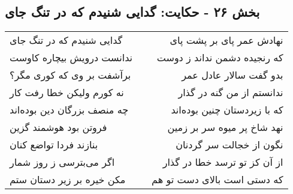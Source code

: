 \begin{center}
\section*{بخش ۲۶ - حکایت: گدایی شنیدم که در تنگ جای}
\label{sec:026}
\begin{longtable}{l p{0.5cm} r}
گدایی شنیدم که در تنگ جای
&&
نهادش عمر پای بر پشت پای
\\
ندانست درویش بیچاره کاوست
&&
که رنجیده دشمن نداند ز دوست
\\
برآشفت بر وی که کوری مگر؟
&&
بدو گفت سالار عادل عمر
\\
نه کورم ولیکن خطا رفت کار
&&
ندانستم از من گنه در گذار
\\
چه منصف بزرگان دین بوده‌اند
&&
که با زیردستان چنین بوده‌اند
\\
فروتن بود هوشمند گزین
&&
نهد شاخ پر میوه سر بر زمین
\\
بنازند فردا تواضع کنان
&&
نگون از خجالت سر گردنان
\\
اگر می‌بترسی ز روز شمار
&&
از آن کز تو ترسد خطا در گذار
\\
مکن خیره بر زیر دستان ستم
&&
که دستی است بالای دست تو هم
\\
\end{longtable}
\end{center}
